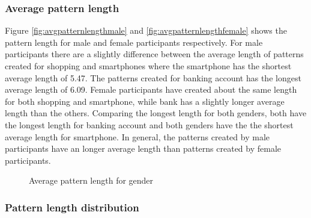     \clearpage
    \subsubsection{Average pattern length}

    Figure \ref{fig:avgpatternlengthmale} and \ref{fig:avgpatternlengthfemale} shows the pattern length for male and female participants respectively. For male participants there are a slightly difference between the average length of patterns created for shopping and smartphones where the smartphone has the shortest average length of 5.47. The patterns created for banking account has the longest average length of 6.09. Female participants have created about the same length for both shopping and smartphone, while bank has a slightly longer average length than the others. Comparing the longest length for both genders, both have the longest length for banking account and both genders have the the shortest average length for smartphone. In general, the patterns created by male participants have an longer average length than patterns created by female participants. 

    \begin{figure}[H]
    	\centering
    	\caption{Average pattern length for gender}
    	\label{fig:avgpatternlengthgender}
    \end{figure}

    \subsubsection{Pattern length distribution}

